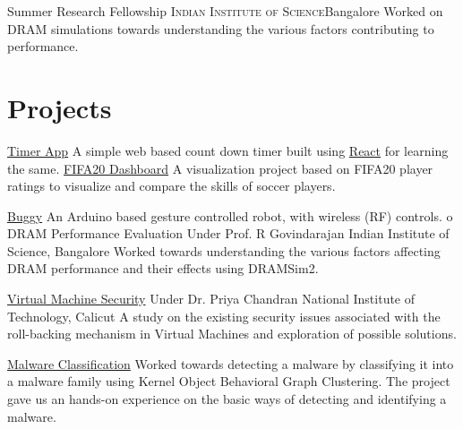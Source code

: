 \documentclass[11pt,a4paper,sans]{moderncv}
\begin{document}
                {Summer Research Fellowship}
                {\textsc{Indian Institute of Science}}{Bangalore}
                {}
                {
                    Worked on  DRAM simulations towards understanding the
                    various factors contributing to performance.
                }


\section{Projects}
    \cventry{}
            {\href{https://github.com/sachinboban/timer-app}{Timer App}}
            {}
            {}
            {}
            {
                A simple web based count down timer built using
                \href{https://reactjs.org/}{React} for learning the same.
            }
    \cventry{}
            {\href{https://github.com/sachinboban/datavis-fifa20-dashboard}{FIFA20 Dashboard}}
            {}
            {}
            {}
            {
                A visualization project based on FIFA20 player ratings to
                visualize and compare the skills of soccer players.
            }

    \cventry{}
            {\href{https://github.com/sachinboban/buggy}{Buggy}}
            {}
            {}
            {}
            {
                An Arduino based gesture controlled robot, with wireless (RF)
                controls.
            o}
    \cventry{}
            {DRAM Performance Evaluation}
            {Under Prof. R Govindarajan}
            {Indian Institute of Science, Bangalore}
            {}
            {
                Worked towards understanding the  various factors affecting DRAM
                performance and their effects using DRAMSim2.
            }

    \cventry{}
            {\href{https://sachinboban.github.io/assets/files/vms.pdf}{Virtual Machine Security}}
            {Under Dr. Priya Chandran}
            {National Institute of Technology, Calicut}
            {}
            {
                A study on the existing security issues associated with the
                roll-backing mechanism in Virtual Machines and exploration of
                possible solutions.
            }

    \cventry{}
            {\href{https://github.com/rahulp0491/Malware-Classifier}{Malware Classification}}
            {}
            {}
            {}
            {
                Worked towards detecting a malware by classifying it into a
                malware family using Kernel Object Behavioral Graph Clustering.
                The project gave us an hands-on experience on the basic ways of
                detecting and identifying a malware.
            }
\end{document}
